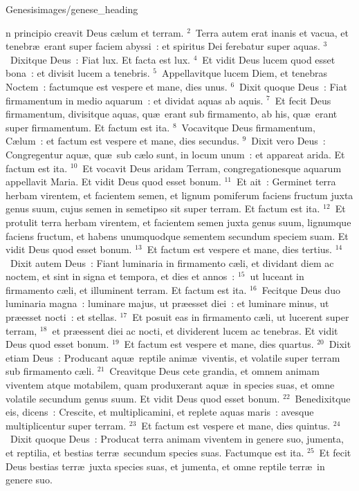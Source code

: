 {Genesis}{images/genese_heading}


\bchapter
{}n principio creavit Deus c\ae lum et terram.
${}^{2}$~Terra autem erat inanis et vacua, et tenebr\ae\ erant super faciem abyssi~: et spiritus Dei ferebatur super aquas.
${}^{3}$~Dixitque Deus~: Fiat lux. Et facta est lux.
${}^{4}$~Et vidit Deus lucem quod esset bona~: et divisit lucem a tenebris.
${}^{5}$~Appellavitque lucem Diem, et tenebras Noctem~: factumque est vespere et mane, dies unus.
${}^{6}$~Dixit quoque Deus~: Fiat firmamentum in medio aquarum~: et dividat aquas ab aquis.
${}^{7}$~Et fecit Deus firmamentum, divisitque aquas, qu\ae\ erant sub firmamento, ab his, qu\ae\ erant super firmamentum. Et factum est ita.
${}^{8}$~Vocavitque Deus firmamentum, C\ae lum~: et factum est vespere et mane, dies secundus.
${}^{9}$~Dixit vero Deus~: Congregentur aqu\ae , qu\ae\ sub c\ae lo sunt, in locum unum~: et appareat arida. Et factum est ita.
${}^{10}$~Et vocavit Deus aridam Terram, congregationesque aquarum appellavit Maria. Et vidit Deus quod esset bonum.
${}^{11}$~Et ait~: Germinet terra herbam virentem, et facientem semen, et lignum pomiferum faciens fructum juxta genus suum, cujus semen in semetipso sit super terram. Et factum est ita.
${}^{12}$~Et protulit terra herbam virentem, et facientem semen juxta genus suum, lignumque faciens fructum, et habens unumquodque sementem secundum speciem suam. Et vidit Deus quod esset bonum.
${}^{13}$~Et factum est vespere et mane, dies tertius.
${}^{14}$~Dixit autem Deus~: Fiant luminaria in firmamento c\ae li, et dividant diem ac noctem, et sint in signa et tempora, et dies et annos~:
${}^{15}$~ut luceant in firmamento c\ae li, et illuminent terram. Et factum est ita.
${}^{16}$~Fecitque Deus duo luminaria magna~: luminare majus, ut pr\ae esset diei~: et luminare minus, ut pr\ae esset nocti~: et stellas.
${}^{17}$~Et posuit eas in firmamento c\ae li, ut lucerent super terram,
${}^{18}$~et pr\ae essent diei ac nocti, et dividerent lucem ac tenebras. Et vidit Deus quod esset bonum.
${}^{19}$~Et factum est vespere et mane, dies quartus.
${}^{20}$~Dixit etiam Deus~: Producant aqu\ae\ reptile anim\ae\ viventis, et volatile super terram sub firmamento c\ae li.
${}^{21}$~Creavitque Deus cete grandia, et omnem animam viventem atque motabilem, quam produxerant aqu\ae\ in species suas, et omne volatile secundum genus suum. Et vidit Deus quod esset bonum.
${}^{22}$~Benedixitque eis, dicens~: Crescite, et multiplicamini, et replete aquas maris~: avesque multiplicentur super terram.
${}^{23}$~Et factum est vespere et mane, dies quintus.
${}^{24}$~Dixit quoque Deus~: Producat terra animam viventem in genere suo, jumenta, et reptilia, et bestias terr\ae\ secundum species suas. Factumque est ita.
${}^{25}$~Et fecit Deus bestias terr\ae\ juxta species suas, et jumenta, et omne reptile terr\ae\ in genere suo.

